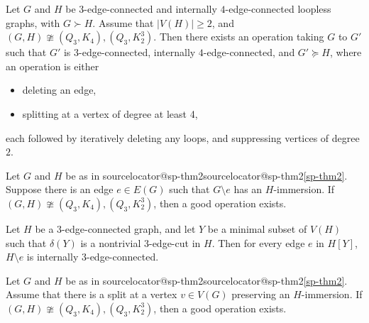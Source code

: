 \documentclass[10pt,a4paper]{amsart}
\makeatletter
\let\originalcref\cref
\renewcommand{\cref}[1]{\ifcsname sourcelocator@#1\endcsname\csname sourcelocator@#1\endcsname\else\originalcref{#1}\fi}
\makeatother
\begin{document}
\begin{theorem}
\label{sp-thm2}
Let $G$ and $H$ be $3$-edge-connected and internally $4$-edge-connected loopless graphs, with $G \succ H$. Assume that $|V(H)|\ge 2$, and $(G, H) \ncong (Q_3, K_4), (Q_3, K_2^3)$. Then there exists an operation taking $G$ to $G'$ such that $G'$ is $3$-edge-connected, internally $4$-edge-connected, and $G' \succeq   H$, where an operation is either
\begin{itemize}
\item deleting an edge,
\item splitting at a vertex of degree at least 4,
\end{itemize}
each followed by iteratively deleting any loops, and suppressing vertices of degree $2$.
\end{theorem}

\begin{lemma}
\label{lem9}
Let $G$ and $H$ be as in \cref{sp-thm2}. Suppose there is an edge $e \in E(G)$ such that $G \setminus e$ has an $H$-immersion. If $(G, H) \ncong (Q_3, K_4), (Q_3, K_2^3)$, then a good operation exists.
\end{lemma}

\begin{lemma}
\label{3econdel}
Let $H$ be a $3$-edge-connected graph, and let $Y$ be a minimal subset of $V(H)$ such that $\delta(Y)$ is a nontrivial $3$-edge-cut in $H$. Then for every edge $e$ in $H[Y]$, $H\setminus e$ is internally $3$-edge-connected.
\end{lemma}

\begin{lemma}
\label{lem10}
Let $G$ and $H$ be as in \cref{sp-thm2}. Assume that there is a split at a vertex $v \in V(G)$ preserving an $H$-immersion. If $(G, H) \ncong (Q_3, K_4), (Q_3, K_2^3)$, then a good operation exists.
\end{lemma}
\end{document}
